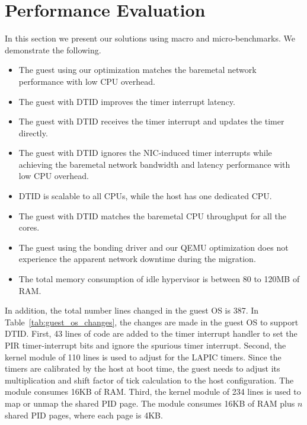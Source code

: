 \section{Performance Evaluation}
In this section we present our solutions using macro
and micro-benchmarks. We demonstrate the following.
\begin{itemize}
  \item The guest using our optimization matches the baremetal
  network performance with low CPU overhead.
  \item The guest with DTID improves the timer interrupt
  latency.
  \item The guest with DTID receives the timer interrupt and
  updates the timer directly.
  \item The guest with DTID ignores the NIC-induced timer
  interrupts while achieving the baremetal network bandwidth
  and latency performance with low CPU overhead.
  \item DTID is scalable to all CPUs, while the host has one
  dedicated CPU.
  \item The guest with DTID matches the baremetal CPU
  throughput for all the cores.
  \item The guest using the bonding driver and our QEMU
  optimization does not experience the apparent network
  downtime during the migration.
  \item The total memory consumption of idle hypervisor is
  between 80 to 120MB of RAM.
\end{itemize}

In addition, the total number lines changed in the guest OS is
387. In Table~\ref{tab:guest_os_changes}, the changes are made
in the guest OS to support DTID. First, 43 lines of code are
added to the timer interrupt handler to set the PIR
timer-interrupt bits and ignore the spurious timer interrupt.
Second, the kernel module of 110 lines is used to adjust for
the LAPIC timers. Since the timers are calibrated by the host
at boot time, the guest needs to adjust its multiplication and
shift factor of tick calculation to the host configuration.
The module consumes 16KB of RAM. Third, the kernel module of
234 lines is used to map or unmap the shared PID page. The
module consumes 16KB of RAM plus $n$ shared PID pages, where
each page is 4KB.

